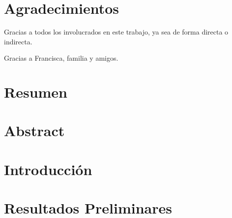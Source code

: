 \documentclass[10pt,letterpaper]{phstylee} %
\begin{document}
%
\setcounter{tocdepth}{2}

\cleardoublepage


\pagestyle{fancyplain}



\chapter*{Agradecimientos}
Gracias a todos los involucrados en este trabajo, ya sea de forma directa o indirecta. \newline 

Gracias a Francisca, familia y amigos.

%

\cleardoublepage
\newpage
\thispagestyle{empty}
\mbox{}
\cleardoublepage

\chapter*{Resumen}


\newpage

\chapter*{Abstract}


\cleardoublepage
\newpage
\thispagestyle{empty}
\mbox{}
\cleardoublepage
 

\tableofcontents
%
\cleardoublepage
{}
\chapter{Introducci\'on}
\label{cap:introduccion}

%
%
\cleardoublepage
\chapter{Resultados Preliminares}
\label{cap:marco}

%
%
\cleardoublepage
\end{document}
